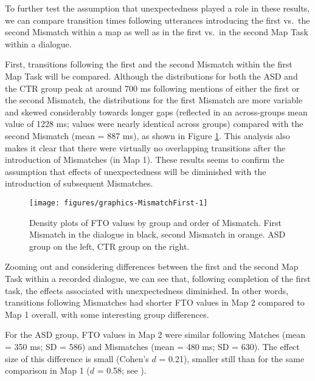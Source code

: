 \label{turntaking_results_mismatches_results_order}

To further test the assumption that unexpectedness played a role in these results, we can compare transition times following utterances introducing the first vs.~the second Mismatch within a map as well as in the first vs.~in the second Map Task within a dialogue.

First, transitions following the first and the second Mismatch within the first Map Task will be compared. Although the distributions for both the ASD and the CTR group peak at around 700 ms following mentions of either the first or the second Mismatch, the distributions for the first Mismatch are more variable and skewed considerably towards longer gaps (reflected in an across-groups mean value of 1228 ms; values were nearly identical across groups) compared with the second Mismatch (mean = 887 ms), as shown in Figure \ref{fig:MismatchFirst}. This analysis also makes it clear that there were virtually no overlapping transitions after the introduction of Mismatches (in Map 1). These results seems to confirm the assumption that effects of unexpectedness will be diminished with the introduction of subsequent Mismatches.



\begin{figure}

{\centering \texttt{[image: figures/graphics-MismatchFirst-1]} 
	
}

\caption{Density plots of FTO values by group and order of Mismatch. First Mismatch in the dialogue in black, second Mismatch in orange. ASD group on the left, CTR group on the right.}\label{fig:MismatchFirst}
\end{figure}

Zooming out and considering differences between the first and the second Map Task within a recorded dialogue, we can see that, following completion of the first task, the effects associated with unexpectedness diminished. In other words, transitions following Mismatches had shorter FTO values in Map 2 compared to Map 1 overall, with some interesting group differences.

For the ASD group, FTO values in Map 2 were similar following Matches (mean = 350 ms; SD = 586) and Mismatches (mean = 480 ms; SD = 630). The effect size of this difference is small (Cohen's \(d\) = 0.21), smaller still than for the same comparison in Map 1 (\(d\) = 0.58; see ).

